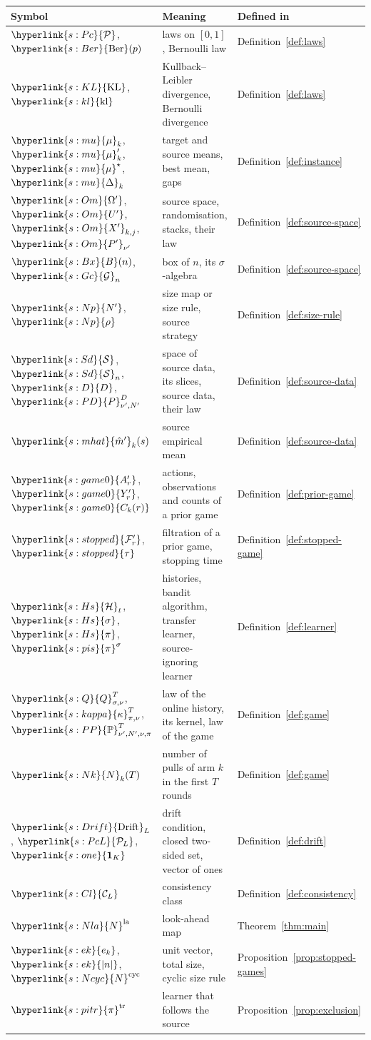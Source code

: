 \documentclass[11pt]{article}
\newcommand{\sy}[2]{\hyperlink{#1}{#2}}
\newcommand{\PP}{\sy{s:PP}{\mathbb{P}}}
\newcommand{\KL}{\sy{s:KL}{\mathrm{KL}}}
\newcommand{\kl}{\sy{s:kl}{\mathrm{kl}}}
\newcommand{\Pc}{\sy{s:Pc}{\mathcal{P}}}
\newcommand{\PcL}[1][L]{\sy{s:PcL}{\mathcal{P}_{#1}}}
\newcommand{\Sd}{\sy{s:Sd}{\mathcal{S}}}
\newcommand{\Gc}{\sy{s:Gc}{\mathcal{G}}}
\newcommand{\Bx}{\sy{s:Bx}{B}}
\newcommand{\ClL}[1][L]{\sy{s:Cl}{\mathcal{C}_{#1}}}
\newcommand{\Hs}{\sy{s:Hs}{\mathcal{H}}}
\newcommand{\Ber}{\sy{s:Ber}{\mathrm{Ber}}}
\newcommand{\Drift}{\sy{s:Drift}{\mathrm{Drift}}}
\newcommand{\one}{\sy{s:one}{\mathbf{1}_{K}}}
\newcommand{\Nla}{\sy{s:Nla}{N}^{\mathrm{la}}}
\newcommand{\pitr}{\sy{s:pitr}{\pi}^{\mathrm{tr}}}
\newcommand{\Np}{\sy{s:Np}{N'}}
\newcommand{\rhos}{\sy{s:Np}{\rho}}
\newcommand{\Dd}{\sy{s:D}{D}}
\newcommand{\PD}{\sy{s:PD}{P}^{D}}
\newcommand{\Q}{\sy{s:Q}{Q}}
\newcommand{\kap}{\sy{s:kappa}{\kappa}}
\newcommand{\Nc}{\sy{s:Nk}{N}}
\newcommand{\mean}{\sy{s:mu}{\mu}}
\newcommand{\gap}{\sy{s:mu}{\Delta}}
\newcommand{\Om}{\sy{s:Om}{\Omega'}}
\newcommand{\Up}{\sy{s:Om}{U'}}
\newcommand{\Xp}{\sy{s:Om}{X'}}
\newcommand{\mhat}{\sy{s:mhat}{\hat m'}}
\newcommand{\pis}{\sy{s:pis}{\pi}^{\sigma}}
\newcommand{\Pp}{\sy{s:Om}{P'}}
\newcommand{\Ncyc}{\sy{s:Ncyc}{N}^{\mathrm{cyc}}}
\begin{document}
\begin{center}
\begin{tabular}{@{}p{}p{}p{}@{}}
\toprule
Symbol & Meaning & Defined in \\
\midrule
$\Pc$, $\Ber(p)$ & laws on $[0,1]$, Bernoulli law & Definition~\ref{def:laws} \\
$\KL$, $\kl$ & Kullback--Leibler divergence, Bernoulli divergence & Definition~\ref{def:laws} \\
$\mean_k$, $\mean'_k$, $\mean^\star$, $\gap_k$ & target and source means, best mean, gaps & Definition~\ref{def:instance} \\
$\Om$, $\Up$, $\Xp_{k,j}$, $\Pp_{\nu'}$ & source space, randomisation, stacks, their law & Definition~\ref{def:source-space} \\
$\Bx(n)$, $\Gc_n$ & box of $n$, its $\sigma$-algebra & Definition~\ref{def:source-space} \\
$\Np$, $\rhos$ & size map or size rule, source strategy & Definition~\ref{def:size-rule} \\
$\Sd$, $\Sd_n$, $\Dd$, $\PD_{\nu',N'}$ & space of source data, its slices, source data, their law & Definition~\ref{def:source-data} \\
$\mhat_k(s)$ & source empirical mean & Definition~\ref{def:source-data} \\
$\sy{s:game0}{A'_r}$, $\sy{s:game0}{Y'_r}$, $\sy{s:game0}{C_k(r)}$ & actions, observations and counts of a prior game & Definition~\ref{def:prior-game} \\
$\sy{s:stopped}{\mathcal F'_r}$, $\sy{s:stopped}{\tau}$ & filtration of a prior game, stopping time & Definition~\ref{def:stopped-game} \\
$\Hs_t$, $\sy{s:Hs}{\sigma}$, $\sy{s:Hs}{\pi}$, $\pis$ & histories, bandit algorithm, transfer learner, source-ignoring learner & Definition~\ref{def:learner} \\
$\Q^T_{\sigma,\nu}$, $\kap^T_{\pi,\nu}$, $\PP^T_{\nu',N',\nu,\pi}$ & law of the online history, its kernel, law of the game & Definition~\ref{def:game} \\
$\Nc_k(T)$ & number of pulls of arm $k$ in the first $T$ rounds & Definition~\ref{def:game} \\
$\Drift_L$, $\PcL$, $\one$ & drift condition, closed two-sided set, vector of ones & Definition~\ref{def:drift} \\
$\ClL$ & consistency class & Definition~\ref{def:consistency} \\
$\Nla$ & look-ahead map & Theorem~\ref{thm:main} \\
$\sy{s:ek}{e_k}$, $\sy{s:ek}{|n|}$, $\Ncyc$ & unit vector, total size, cyclic size rule & Proposition~\ref{prop:stopped-games} \\
$\pitr$ & learner that follows the source & Proposition~\ref{prop:exclusion} \\
\bottomrule
\end{tabular}
\end{center}



\end{document}
